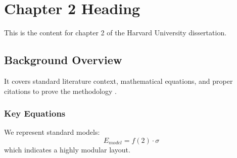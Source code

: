 \chapter{Chapter 2 Heading}
\label{ch:chapter2}
This is the content for chapter 2 of the Harvard University dissertation.

\section{Background Overview}
It covers standard literature context, mathematical equations, and proper citations to prove the methodology \cite{texbook}.

\subsection{Key Equations}
We represent standard models:
\begin{equation}
    E_{model} = f(2) \cdot \sigma
\end{equation}
which indicates a highly modular layout.
